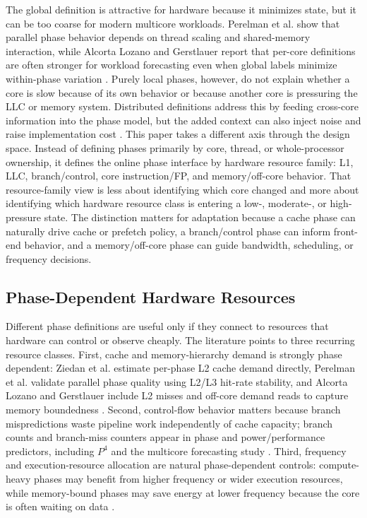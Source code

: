 \documentclass[10pt,twocolumn]{article}
\begin{document}
The global definition is attractive for hardware because it minimizes state, but it can be too coarse for modern multicore workloads.
Perelman et al. show that parallel phase behavior depends on thread scaling and shared-memory interaction, while Alcorta Lozano and Gerstlauer report that per-core definitions are often stronger for workload forecasting even when global labels minimize within-phase variation \cite{perelman2006parallel,lozano2022phase}.
Purely local phases, however, do not explain whether a core is slow because of its own behavior or because another core is pressuring the LLC or memory system.
Distributed definitions address this by feeding cross-core information into the phase model, but the added context can also inject noise and raise implementation cost \cite{lozano2022phase}.
This paper takes a different axis through the design space.
Instead of defining phases primarily by core, thread, or whole-processor ownership, it defines the online phase interface by hardware resource family: L1, LLC, branch/control, core instruction/FP, and memory/off-core behavior.
That resource-family view is less about identifying which core changed and more about identifying which hardware resource class is entering a low-, moderate-, or high-pressure state.
The distinction matters for adaptation because a cache phase can naturally drive cache or prefetch policy, a branch/control phase can inform front-end behavior, and a memory/off-core phase can guide bandwidth, scheduling, or frequency decisions.

\subsection{Phase-Dependent Hardware Resources}

Different phase definitions are useful only if they connect to resources that hardware can control or observe cheaply.
The literature points to three recurring resource classes.
First, cache and memory-hierarchy demand is strongly phase dependent: Ziedan et al. estimate per-phase L2 cache demand directly, Perelman et al. validate parallel phase quality using L2/L3 hit-rate stability, and Alcorta Lozano and Gerstlauer include L2 misses and off-core demand reads to capture memory boundedness \cite{ziedan2016runtime,perelman2006parallel,lozano2022phase}.
Second, control-flow behavior matters because branch mispredictions waste pipeline work independently of cache capacity; branch counts and branch-miss counters appear in phase and power/performance predictors, including $P^4$ and the multicore forecasting study \cite{kim2017p4,lozano2022phase}.
Third, frequency and execution-resource allocation are natural phase-dependent controls: compute-heavy phases may benefit from higher frequency or wider execution resources, while memory-bound phases may save energy at lower frequency because the core is often waiting on data \cite{carpentieri2025frequency,kim2017p4,nomani2015predicting}.
\end{document}
